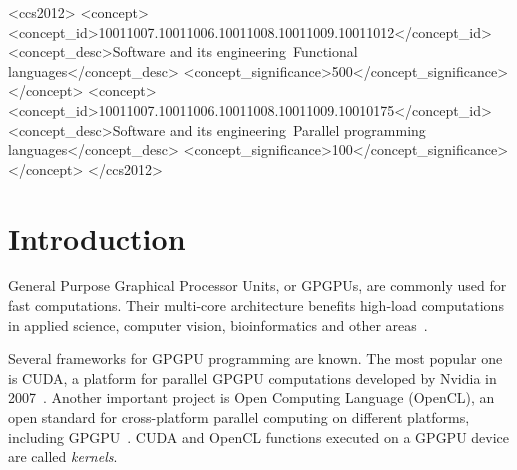 \documentclass[sigplan]{acmart}\settopmatter{}
\begin{document}
\begin{CCSXML}
<ccs2012>
<concept>
<concept_id>10011007.10011006.10011008.10011009.10011012</concept_id>
<concept_desc>Software and its engineering~Functional languages</concept_desc>
<concept_significance>500</concept_significance>
</concept>
<concept>
<concept_id>10011007.10011006.10011008.10011009.10010175</concept_id>
<concept_desc>Software and its engineering~Parallel programming languages</concept_desc>
<concept_significance>100</concept_significance>
</concept>
</ccs2012>
\end{CCSXML}




\maketitle


\section{Introduction} %

General Purpose Graphical Processor Units, or GPGPUs, are commonly used for fast computations. Their multi-core architecture benefits high-load computations in applied science, computer vision, bioinformatics and other areas~\cite{CUDA_to_OpenCL, GPGPU_1}.

Several frameworks for GPGPU programming are known. The most popular one is CUDA, a platform for parallel GPGPU computations developed by Nvidia in 2007~\cite{CUDA}. Another important project is Open Computing Language (OpenCL), an open standard for cross-platform parallel computing on different platforms, including GPGPU~\cite{OpenCL}. CUDA and OpenCL functions executed on a GPGPU device are called \textit{kernels}.
\end{document}
